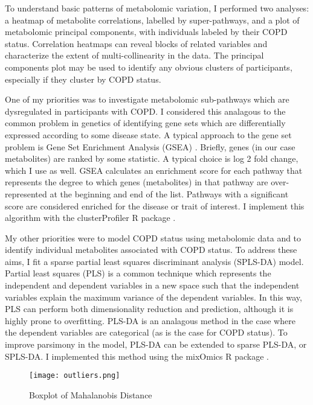 \documentclass{article}
\begin{document}
To understand basic patterns of metabolomic variation, I performed two analyses: a heatmap of metabolite correlations, labelled by super-pathways, and a plot of metabolomic principal components, with individuals labeled by their COPD status. Correlation heatmaps can reveal blocks of related variables and characterize the extent of multi-collinearity in the data. The principal components plot may be used to identify any obvious clusters of participants, especially if they cluster by COPD status.

One of my priorities was to investigate metabolomic sub-pathways which are dysregulated in participants with COPD. I considered this analagous to the common problem in genetics of identifying gene sets which are differentially expressed according to some disease state. A typical approach to the gene set problem is Gene Set Enrichment Analysis (GSEA) \cite{subramanianGeneSetEnrichment2005}. Briefly, genes (in our case metabolites) are ranked by some statistic. A typical choice is log 2 fold change, which I use as well. GSEA calculates an enrichment score for each pathway that represents the degree to which genes (metabolites) in that pathway are over-represented at the beginning and end of the list. Pathways with a significant score are considered enriched for the disease or trait of interest. I implement this algorithm with the clusterProfiler R package \cite{wuClusterProfilerUniversalEnrichment2021}.

My other priorities were to model COPD status using metabolomic data and to identify individual metabolites associated with COPD status. To address these aims, I fit a sparse partial least squares discriminant analysis (SPLS-DA) model. Partial least squares (PLS) is a common technique which represents the independent and dependent variables in a new space such that the independent variables explain the maximum variance of the dependent variables. In this way, PLS can perform both dimensionality reduction and prediction, although it is highly prone to overfitting. PLS-DA \cite{perez-encisoPredictionClinicalOutcome2003} is an analagous method in the case where the dependent variables are categorical (as is the case for COPD status). To improve parsimony in the model, PLS-DA can be extended to sparse PLS-DA, or SPLS-DA. I implemented this method using the mixOmics R package \cite{rohartMixOmicsPackageOmics2017a}.

\begin{figure}
  \centering
  \caption{Boxplot of Mahalanobis Distance}
  \texttt{[image: outliers.png]}
  \label{fig:mahDist}
  \end{figure}
\end{document}
